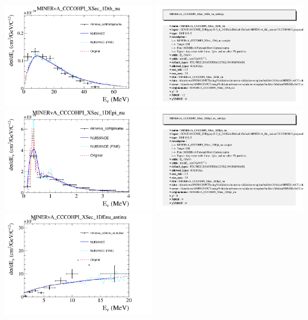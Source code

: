 \documentclass{article}
\begin{document}
\centering
\includegraphics[width=0.49\textwidth]{figures/minerva_cohthetapinumu_comp.png}
\includegraphics[width=0.49\textwidth]{figures/minerva_cohthetapinumu_info.png}
\centering
\includegraphics[width=0.49\textwidth]{figures/minerva_cohtpinumu_comp.png}
\includegraphics[width=0.49\textwidth]{figures/minerva_cohtpinumu_info.png}
\centering
\includegraphics[width=0.49\textwidth]{figures/minerva_cohenu_numubar_comp.png}
\end{document}
